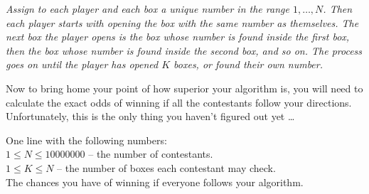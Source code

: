\textit{Assign to each player and each box a unique number in the range $1, \dots, N$. Then each player starts with opening the box with the same number as themselves. The next box the player opens is the box whose number is found inside the first box, then the box whose number is found inside the second box, and so on. The process goes on until the player has opened $K$ boxes, or found their own number.} 

Now to bring home your point of how superior your algorithm is, you will need to calculate the exact odds of winning if all the contestants follow your directions. Unfortunately, this is the only thing you haven't figured out yet \dots 

\Input
One line with the following numbers:\\
$1 \leq N \leq 10000000$ -- the number of contestants.\\
$1 \leq K \leq N$ -- the number of boxes each contestant may check.\\

\Output
The chances you have of winning if everyone follows your algorithm.\\





